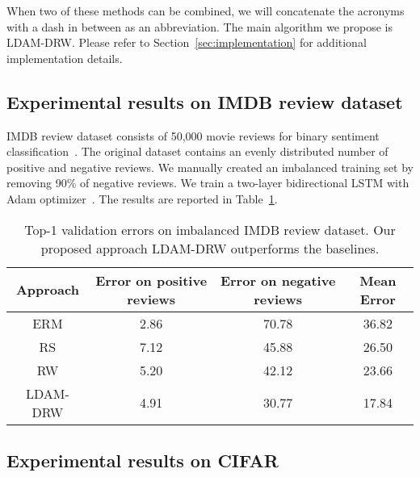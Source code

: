 \documentclass{article}
\newcommand{\ldam}{\textup{LDAM}}
\newcommand{\BMCE}{{\ldam}}
\newcommand{\tstagew}{DRW}
\begin{document}
When two of these methods can be combined, we will concatenate the acronyms with a dash in between as an abbreviation. The main algorithm we propose is \BMCE{}-\tstagew{}. Please refer to Section~\ref{sec:implementation} for additional implementation details. 

\subsection{Experimental results on IMDB review dataset}\label{sec:IMDB}

IMDB review dataset consists of 50,000 movie reviews for binary sentiment classification~\citep{maas2011learning}. The original dataset contains an evenly distributed number of positive and negative reviews. We manually created an imbalanced training set by removing 90\% of negative reviews. We train a two-layer bidirectional LSTM with Adam optimizer~\citep{kingma2014adam}. The results are reported in Table~\ref{tab:lmdb-table}.

\begin{table}[]
	\caption{Top-1 validation errors on imbalanced IMDB review dataset. Our proposed approach LDAM-DRW outperforms the baselines.}
	\label{tab:lmdb-table}
	\centering
	\begin{tabular}{c|ccc}
		\toprule
		Approach & Error on positive reviews&  Error on negative reviews& Mean Error \\
		\midrule
		ERM & 2.86 & 70.78 & 36.82 \\
		RS & 7.12 & 45.88 & 26.50 \\
		RW & 5.20 & 42.12 & 23.66 \\
		LDAM-DRW & 4.91 & 30.77 & 17.84 \\
		\bottomrule
	\end{tabular}
\end{table}

\subsection{Experimental results on CIFAR}\label{sec:cifar}
\end{document}
